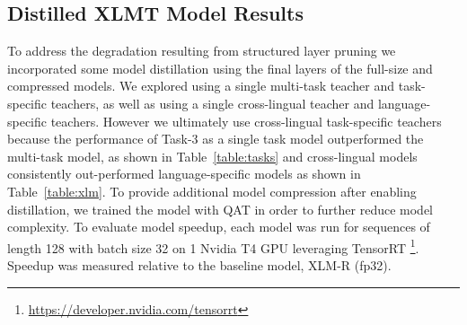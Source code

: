 \subsection*{Distilled XLMT Model Results}
To address the degradation resulting from structured layer pruning we incorporated some model distillation using the final layers of the full-size and compressed models.
We explored using a single multi-task teacher and task-specific teachers, as well as using a single cross-lingual teacher and language-specific teachers.
However we ultimately use cross-lingual task-specific teachers because the performance of Task-3 as a single task model outperformed the multi-task model, as shown in Table~\ref{table:tasks} and cross-lingual models consistently out-performed language-specific models as shown in Table~\ref{table:xlm}.
To provide additional model compression after enabling distillation, we trained the model with QAT in order to further reduce model complexity.
To evaluate model speedup, each model was run for sequences of length 128 with batch size 32 on 1 Nvidia T4 GPU leveraging TensorRT \footnote{\url{https://developer.nvidia.com/tensorrt}}.
Speedup was measured relative to the baseline model, XLM-R (fp32). 


\begin{table}[!htb]
\centering
\renewcommand{\arraystretch}{1.2}
\caption{
Results on model distillation and quantization aware training. 
Task-1, Task-2, and Task-3 results are reported in macro-F1 scores.  
XLM-R models were used as the teacher in all results, except for MiniLM-L12-mBert which used mBert teachers.
}
\label{table:distill}
\end{table}

